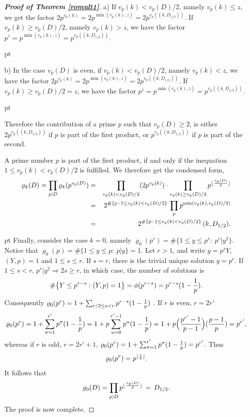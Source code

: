 \documentclass[11pt,draft,reqno]{amsart}
\theoremstyle{definition}
\theoremstyle{remarks}
\numberwithin{equation}{section}
\def \s{{\sigma}}
\begin{document}
\begin{proof}[\bf Proof of Theorem \ref{romult1}]
a) If $v_p(k)<{v_p(D)/2}$, namely $v_p(k)\le z$, we get the factor $2p^{v_p(k)}= 2p^{\min(v_p(k),z)}=2p^{  v_p((k,D_{1/2})) }$. If $v_p(k)\ge{v_p(D)/2}$, namely $v_p(k)> z$, we have the factor $p^z=p^{\min(v_p(k),z)}=p^{  v_p((k,D_{1/2})) }$. 

 
 pt
 
b) In the case $v_p(D)$ is even, if $v_p(k)<{v_p(D)/2}$, namely $v_p(k)< z$, we have the factor $2p^{v_p(k)}=2p^{\min(v_p(k),z)}=2p^{  v_p((k,D_{1/2})) }$. If $v_p(k)\ge {v_p(D)/2}= z$, we have the factor $p^{z}=p^{\min(v_p(k),z)}=p^{  v_p((k,D_{1/2})) }$.

 pt 

  Therefore the  contribution of 
 a prime $p$ such that $v_p(D)\ge 2$, is   either $2p^{  v_p((k,D_{1/2})) }$ if $p$ is part of the first product, or $p^{  v_p((k,D_{1/2})) }$ if $p$ is part of the second. 
 
 A prime number $p$ is part of the first product, if and only if the inequation $1\le v_p(k)<v_p(D)/2$ is fulfilled.
 We 
therefore get the condensed form, 
\begin{eqnarray} \label{valro1}\varrho_k(D)= \prod_{p|D  }\varrho_k(p^{  v_p(D) })&= & \prod_{ v_p(k)<{v_p(D)/
2}}(2p^{v_p(k)})\cdot\prod_{   v_p(k)\ge {v_p(D)/
2} }  p^{\lfloor{v_p(D)\over
2}\rfloor}\cr  &=&2^{\#\{p\,:\, 1\le v_p(k)<v_p(D)/2 \}}\,\prod_{p} p^  {\min (v_p(k),v_p(D)/2)} 
\cr  &=&2^{\#\{p\,:\, 1\le v_p(k)<v_p(D)/2 \}}\, (k, D_{1/2}).
\end{eqnarray} 




 pt Finally,   consider the case  $k=0$, namely       $\varrho_0(p^r)=\#\big\{1\le y\le p^r: \  p^r| y^2   \big\}  $. Notice that 
$\varrho_0(p)=\#\big\{1\le y\le
p: \  p| y   \big\}=1 $. Let
$r>1$, and write   $y=p^sY$, $(Y,p)=1$ and $1\le s\le r$. If $s=r$, there is the trivial unique solution $y=p^r$. If $1\le s<r$,
 $p^r| y^2\Rightarrow 2s\ge r$, in which case, the number of solutions is  
$$\#\big\{Y\le p^{r- s}: (Y,p)=1\big\}=\phi(p^{r- s})=p^{r- s}(1-{1\over p}).  $$
 Consequently
 $\varrho_0(p^r)= 1+\sum_{r/2\le s< r}p^{r- s}(1-{1\over p})$ . 
If $r$ is even, $r=2r'$
$$\varrho_0(p^r)= 1+\sum_{\s =1}^{r' } p^{\s}(1-{1\over p})= 1+p\sum_{u =0}^{r'-1 } p^{u}(1-{1\over p})= 1+p\Big({p^{r' }-1\over p-1}\Big)
 ( {p-1\over p})=p^{r' } ,$$
whereas if $r$ is odd, $r=2r'+1$,
 $\varrho_0(p^r)= 1+\sum_{\s =1}^{r'} p^{\s}(1-{1\over p})=p^{r' }$.
Thus 
$$\varrho_0(p^r)=p^{\lfloor {r\over 2}\rfloor }. $$
It follows that 
$$\varrho_0(D)=\prod_{p|D} p^{\lfloor {v_p(D)\over 2}\rfloor }\, =\, D_{1/2}.  $$
The proof is now complete. 
\end{proof}
\end{document}
